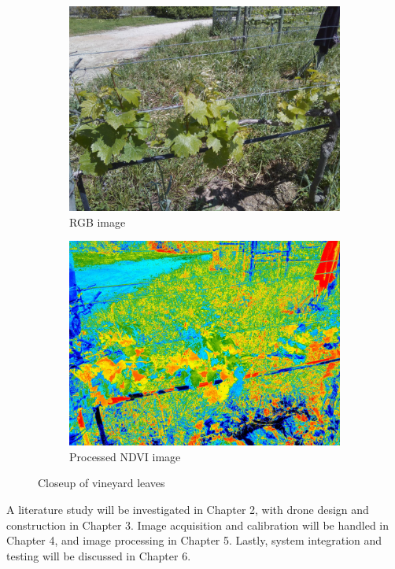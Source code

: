 \begin{figure}[H]
\begin{subfigure}{0.5\textwidth}
\centering
\includegraphics[scale=0.17]{images/rgb_leaves.jpg}
\caption{RGB image}
\end{subfigure}
\begin{subfigure}{0.5\textwidth}
\centering
\includegraphics[scale=0.17]{images/ndvi_leaves.jpg}
\caption{Processed NDVI image}
\end{subfigure}
\caption{Closeup of vineyard leaves}
\label{fig:vineyard_leaves}
\end{figure}

%
%

A literature study will be investigated in Chapter 2, with drone design and construction in Chapter 3. Image acquisition and calibration will be handled in Chapter 4, and image processing in Chapter 5. Lastly, system integration and testing will be discussed in Chapter 6.